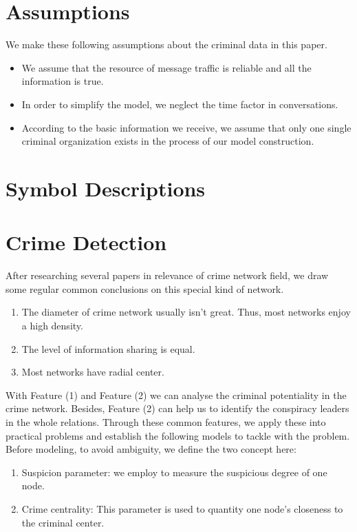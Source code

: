 \documentclass[12pt]{article}
\begin{document}
\begin{itemize}
\begin{itemize}
\section{Assumptions} 
	We make these following assumptions about the criminal data in this paper.
\begin{itemize}
\item We assume that the resource of message traffic is reliable and all the information is true.
\item In order to simplify the model, we neglect the time factor in conversations.
\item According to the basic information we receive, we assume that only one single  criminal organization exists in the process of our model construction.
\end{itemize}

\section{Symbol Descriptions}

\section{Crime Detection}
	After researching several papers in relevance of crime network field, we draw some regular common conclusions on this special kind of network.
\begin{enumerate}
\item The diameter of crime network usually isn’t great. Thus, most networks enjoy a high density.
\item The level of information sharing is equal.
\item Most networks have radial center.
\end{enumerate}
	With Feature (1) and Feature (2) we can analyse the criminal potentiality in the crime network. Besides, Feature (2) can help us to identify the conspiracy leaders in the whole relations.
	Through these common features, we apply these into practical problems and establish the following models to tackle with the problem.
	Before modeling, to avoid ambiguity, we define the two concept here:
\begin{enumerate}
\item Suspicion parameter: we employ to measure the suspicious degree of one node.
\item Crime centrality: This parameter is used to quantity one node’s closeness to the criminal center.
\end{enumerate}


\end{itemize}
\end{itemize}
\end{document}
